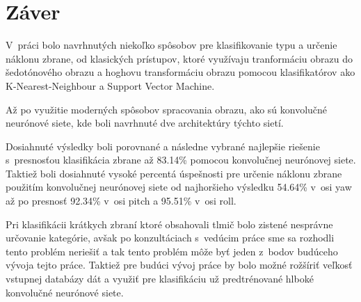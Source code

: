 
\chapter{Záver}

V~práci bolo navrhnutých niekoľko spôsobov pre klasifikovanie typu a určenie náklonu zbrane, od klasických prístupov,
    ktoré využívaju tranformáciu obrazu do šedotónového obrazu a hoghovu transformáciu obrazu pomocou
    klasifikatórov ako K-Nearest-Neighbour a Support Vector Machine.

Až po využitie moderných spôsobov spracovania obrazu, ako sú konvolučné neurónové siete, kde boli navrhnuté
    dve architektúry týchto sietí.

Dosiahnuté výsledky boli porovnané a následne vybrané najlepšie riešenie s~presnosťou klasifikácia zbrane až 83.14\%
    pomocou konvolučnej neurónovej siete.
Taktiež boli dosiahnuté vysoké percentá úspešnosti pre určenie náklonu zbrane použitím konvolučnej neurónovej siete od
    najhoršieho výsledku 54.64\% v~osi yaw až po presnosť 92.34\% v~osi pitch a 95.51\% v~osi roll.

Pri klasifikácii krátkych zbraní ktoré obsahovali tlmič bolo zistené nesprávne určovanie kategórie, avšak po
    konzultáciach s~vedúcim práce sme sa rozhodli tento problém neriešiť a tak tento problém môže byť jeden z~bodov
    budúceho vývoja tejto práce.
Taktiež pre budúci vývoj práce by bolo možné rožšíriť veľkosť vstupnej databázy dát a využiť pre klasifikáciu
    už predtrénované hlboké konvolučné neurónové siete.

